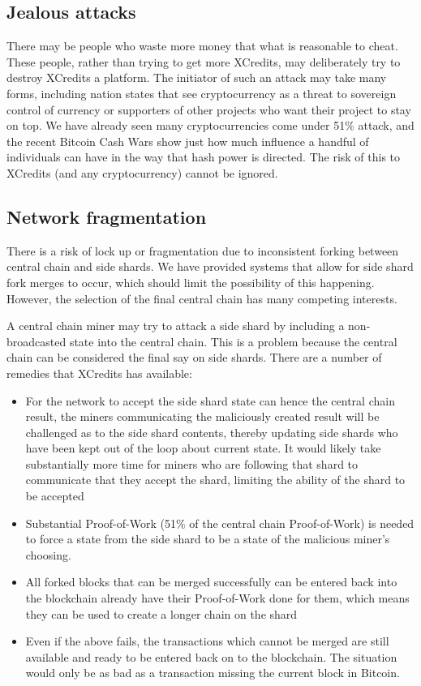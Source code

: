 \documentclass[a4paper,12pt]{article}
\begin{document}
\subsection{Jealous attacks}
There may be people who waste more money that what is reasonable to cheat. These people, rather than trying to get more XCredits, may deliberately try to destroy XCredits a platform. The initiator of such an attack may take many forms, including nation states that see cryptocurrency as a threat to sovereign control of currency or supporters of other projects who want their project to stay on top. We have already seen many cryptocurrencies come under 51\% attack, and the recent Bitcoin Cash Wars show just how much influence a handful of individuals can have in the way that hash power is directed. The risk of this to XCredits (and any cryptocurrency) cannot be ignored. 

\subsection{Network fragmentation}
There is a risk of lock up or fragmentation due to inconsistent forking between central chain and side shards. We have provided systems that allow for side shard fork merges to occur, which should limit the possibility of this happening. However, the selection of the final central chain has many competing interests. 

A central chain miner may try to attack a side shard by including a non-broadcasted state into the central chain. This is a problem because the central chain can be considered the final say on side shards. There are a number of remedies that XCredits has available:

\begin{itemize}
  \item For the network to accept the side shard state can hence the central chain result, the miners communicating the maliciously created result will be challenged as to the side shard contents, thereby updating side shards who have been kept out of the loop about current state. It would likely take substantially more time for miners who are following that shard to communicate that they accept the shard, limiting the ability of the shard to be accepted
  \item Substantial Proof-of-Work (51\% of the central chain Proof-of-Work) is needed to force a state from the side shard to be a state of the malicious miner's choosing.   
  \item All forked blocks that can be merged successfully can be entered back into the blockchain already have their Proof-of-Work done for them, which means they can be used to create a longer chain on the shard  
  \item Even if the above fails, the transactions which cannot be merged are still available and ready to be entered back on to the blockchain. The situation would only be as bad as a transaction missing the current block in Bitcoin.
\end{itemize}
\end{document}
